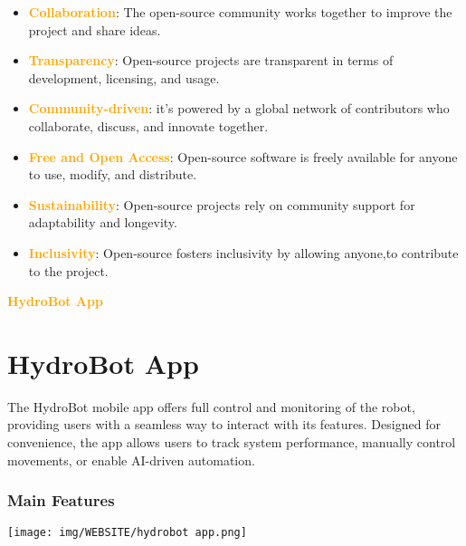 \begin{itemize}
    \item \textbf{\textcolor{orange}{Collaboration}}: The open-source community works together to improve the project and share ideas.
    \item \textbf{\textcolor{orange}{Transparency}}: Open-source projects are transparent in terms of development, licensing, and usage.
    \item \textbf{\textcolor{orange}{Community-driven}}: it's powered by a global network of contributors who collaborate, discuss, and innovate together.
    \item \textbf{\textcolor{orange}{Free and Open Access}}: Open-source software is freely available for anyone to use, modify, and distribute.
    \item \textbf{\textcolor{orange}{Sustainability}}: Open-source projects rely on community support for adaptability and longevity.
    \item \textbf{\textcolor{orange}{Inclusivity}}: Open-source fosters inclusivity by allowing anyone,to contribute to the project.
\end{itemize}

\newpage
\begin{center}
    \huge \textbf{\textcolor{orange}{HydroBot App}} \\[0.5cm]
 
\end{center}
\section{\large \textbf{HydroBot App}}
The HydroBot mobile app offers full control and monitoring of the robot, providing users with a seamless way to interact with its features. Designed for convenience, the app allows users to track system performance, manually control movements, or enable AI-driven automation.

\subsubsection{Main Features}
\begin{center}
  \texttt{[image: img/WEBSITE/hydrobot app.png]}
\end{center}

